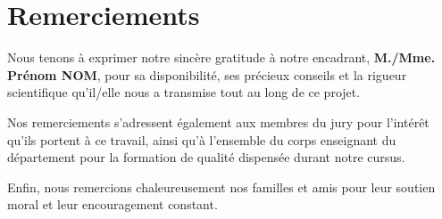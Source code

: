 \chapter*{Remerciements}

Nous tenons à exprimer notre sincère gratitude à notre encadrant,
\textbf{M./Mme. Prénom NOM}, pour sa disponibilité, ses précieux conseils
et la rigueur scientifique qu'il/elle nous a transmise tout au long de ce projet.

Nos remerciements s'adressent également aux membres du jury pour l'intérêt qu'ils
portent à ce travail, ainsi qu'à l'ensemble du corps enseignant du département pour
la formation de qualité dispensée durant notre cursus.

Enfin, nous remercions chaleureusement nos familles et amis pour leur soutien moral
et leur encouragement constant.
